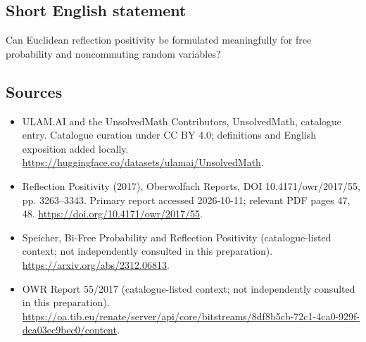 \documentclass[11pt]{article}
\begin{document}
\subsection{Short English statement}
Can Euclidean reflection positivity be formulated meaningfully for free probability and noncommuting random variables?
\subsection{Sources}
\begin{itemize}
\item[\hypertarget{source:statement:1}{S1}] ULAM.AI and the UnsolvedMath Contributors, UnsolvedMath, catalogue entry. Catalogue curation under CC BY 4.0; definitions and English exposition added locally.
\url{https://huggingface.co/datasets/ulamai/UnsolvedMath}.
\item[\hypertarget{source:statement:2}{S2}] Reflection Positivity (2017), Oberwolfach Reports, DOI 10.4171/owr/2017/55, pp. 3263--3343. Primary report accessed 2026-10-11; relevant PDF pages 47, 48.
\url{https://doi.org/10.4171/owr/2017/55}.
\item[\hypertarget{source:statement:3}{S3}] Speicher, Bi-Free Probability and Reflection Positivity (catalogue-listed context; not independently consulted in this preparation).
\url{https://arxiv.org/abs/2312.06813}.
\item[\hypertarget{source:statement:4}{S4}] OWR Report 55/2017 (catalogue-listed context; not independently consulted in this preparation).
\url{https://oa.tib.eu/renate/server/api/core/bitstreams/8df8b5cb-72c1-4ca0-929f-dca03ec9bec0/content}.
\end{itemize}
\label{end:statement}
\end{document}

